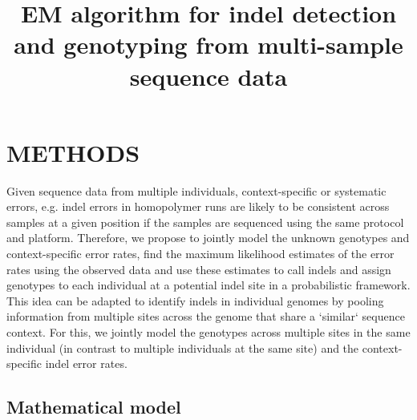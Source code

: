 \documentclass{article}
\title{EM algorithm for indel detection and genotyping from multi-sample sequence data }
\newcommand{\old}[1]{}
\begin{document}
\maketitle


\old{
\section{Introduction}

Existing methods for the detection of short indels from sequence reads~\cite{Li2011,DePristo2011,Albers2011}
utilize read alignment scores, individual base quality scores
and estimates of sequence-context specific indel error rates, e.g. errors in homopolymer runs, to calculate genotype likelihoods
and call indels. The methods that we describe here use information about 
indel error rates present in the sequence data itself to distinguish true indels from sequencing errors and other artifacts.
Since indel errors observed in the sequence reads are likely to be
context-specific, e.g. insertion/deletion of a one or more bases in homopolymer runs, pooling information from multiple individuals to estimate the indel error rates at each specific position and calculating genotype likelihoods using these estimated error rates is a powerful approach for indel detection.
}


\section{METHODS}

Given sequence data from multiple individuals, context-specific or systematic errors, e.g. indel errors in homopolymer runs are likely to be
consistent across samples at a given position if the samples are sequenced using the same protocol and platform.
Therefore, we propose to jointly model the unknown genotypes and
context-specific error rates, find the maximum
likelihood estimates of the error rates using the observed data and use these estimates to call indels and assign genotypes
to each individual at a potential indel site in a probabilistic framework.
This idea can be adapted to identify indels in individual genomes by
pooling information from multiple sites across the genome that share a `similar` sequence context.
For this, we jointly model the genotypes across multiple sites in the same individual (in contrast to multiple individuals at the same
site) and the context-specific indel error rates.

\subsection{Mathematical model}
\end{document}
